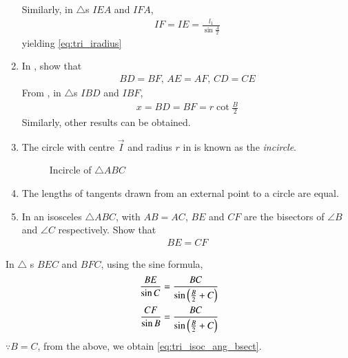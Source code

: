 \begin{enumerate}[label=\thesubsection.\arabic*.,ref=\thesubsection.\theenumi]
		Similarly, 
in $\triangle$s $IEA$ and $IFA$, 
		\begin{align}
IF = IE=  \frac{l_1}{\sin\frac{A}{2}}
		\end{align}
		yielding 
	\eqref{eq:tri_iradius}	
  \item In
	, show that
  \begin{align}
	  BD=BF ,\, 
	  AE=AF ,\, 
	  CD=CE 
  \end{align}
  \solution  From 
, in $\triangle$s $IBD$ and $IBF$, 
		\begin{align}
			x = BD = BF = r \cot \frac{B}{2}
		\end{align}
		Similarly, other results can be obtained.
\item The circle with centre $\vec{I}$ and radius $r$ in  
is known as the {\em incircle}. 
\begin{figure}[!ht]
	\begin{center}
		\resizebox{0.6\columnwidth}{!}{}
	\end{center}
	\caption{Incircle of $\triangle ABC$}
	\label{fig:tri_icircle}	
\end{figure}
\item The lengths of tangents drawn from an external point to a circle are equal.
\item In an isosceles $\triangle ABC$, with $AB = AC$, $BE$ and $CF$ are the bisectors of $\angle B$ and $\angle C$ respectively.   Show that 
\begin{align}
BE = CF
	\label{eq:tri_isoc_ang_bsect}
\end{align}
\begin{figure}[H]
	\centering
		\resizebox{0.6\columnwidth}{!}{}
	\caption{}
	\label{fig:tri_isoc_ang_bsect}
\end{figure}
\end{enumerate}
\solution
%
In $\triangle$ s $BEC$ and $BFC$, using the sine formula, 
\begin{align}
	\label{eq:tri_isoc_ang_bsect-inter}
	\frac{BE}{\sin C}
	&=\frac{BC}{\sin \left(\frac{B}{2}+C\right)}
	\\
	\frac{CF}{\sin B}
	&=\frac{BC}{\sin \left(\frac{B}{2}+C\right)}
\end{align}
$\because B = C$, from the above, we obtain
	\eqref{eq:tri_isoc_ang_bsect}.
